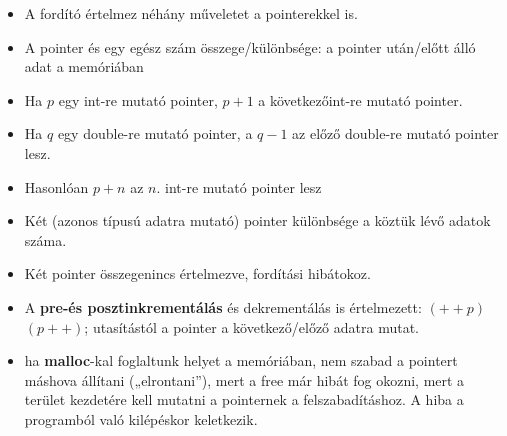 \documentclass[11pt,a4paper]{article}
\begin{document}
            \begin{tcolorbox}[colback=blue!5!white,colframe=blue!50!black,title= 52. Ismertesse a pointer aritmetikát!]
                \begin{itemize}
                    \item A fordító értelmez néhány műveletet a pointerekkel is.
                    \item A pointer és egy egész szám összege/különbsége: a pointer után/előtt álló adat a memóriában
                    \item Ha \(p\) egy int-re mutató pointer, \(p+1\) a következőint-re mutató pointer.
                    \item Ha \(q\) egy double-re mutató pointer, a \(q-1\) az előző double-re mutató pointer lesz.
                    \item Hasonlóan \(p+n\) az \(n.\) int-re mutató pointer lesz
                    \item Két (azonos típusú adatra mutató) pointer különbsége a köztük lévő adatok száma.
                    \item Két pointer összegenincs értelmezve, fordítási hibátokoz.
                    \item A \textbf{pre-és posztinkrementálás} és dekrementálás is értelmezett: \((++p)\) \((p++)\); utasítástól a pointer a következő/előző adatra mutat.
                    \item ha \textbf{malloc}-kal foglaltunk helyet a memóriában, nem szabad a pointert máshova állítani („elrontani”), mert a free már hibát fog okozni, mert a terület kezdetére kell mutatni a pointernek a felszabadításhoz. A hiba a programból való kilépéskor keletkezik.
                \end{itemize}
                \begin{center}
                \end{center}

            \end{tcolorbox}
 
\end{document}
